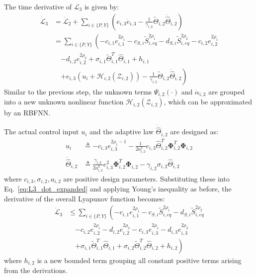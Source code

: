 The time derivative of $\mathcal{L}_3$ is given by:
\begin{align}
    \dot{\mathcal{L}}_3 &= \dot{\mathcal{L}}_2 + \sum_{i \in \{P,Y\}} \left( e_{i,3} \dot{e}_{i,3} - \frac{1}{\gamma_{i,2}} \widetilde{\Theta}_{i,2} \dot{\widehat{\Theta}}_{i,2} \right) \nonumber \\
    &= \sum_{i \in \{P,Y\}} \left( -c_{i,1} e_{i,1}^{2\rho_1} - c_{S,i} \widetilde{S}_{i,eq}^{2\rho_1} - d_{S,i} \widetilde{S}_{i,eq}^{2\rho_2} - c_{i,2} e_{i,2}^{2\rho_1} \right. \nonumber \\
    &\quad \left. - d_{i,2} e_{i,2}^{2\rho_2} + \sigma_{i,1} \widetilde{\Theta}_{i,1}^T \widehat{\Theta}_{i,1} + h_{i,1} \right. \nonumber \\
    &\quad \left. + e_{i,3} (u_i + \mathcal{H}_{i,2}(\mathcal{Z}_{i,2})) - \frac{1}{\gamma_{i,2}} \widetilde{\Theta}_{i,2} \dot{\widehat{\Theta}}_{i,2} \right) \label{eq:L3_dot_expanded}
\end{align}
Similar to the previous step, the unknown terms $\Psi_{i,2}(\cdot)$ and $\dot{\alpha}_{i,2}$ are grouped into a new unknown nonlinear function $\mathcal{H}_{i,2}(\mathcal{Z}_{i,2})$, which can be approximated by an RBFNN.

The actual control input $u_i$ and the adaptive law $\dot{\widehat{\Theta}}_{i,2}$ are designed as:
\begin{align}
    u_i &\triangleq  - c_{i,3} e_{i,3}^{2\rho_1-1} - \frac{1}{2a_{i,2}^2} e_{i,3} \widehat{\Theta}_{i,2}^T \mathbf{\Phi}_{i,2}^T \mathbf{\Phi}_{i,2} \label{eq:uk} \\
    \dot{\widehat{\Theta}}_{i,2} &\triangleq \frac{\gamma_{i,2}}{2a_{i,2}^2} e_{i,3}^2 \mathbf{\Phi}_{i,2}^T \mathbf{\Phi}_{i,2} - \gamma_{i,2} \sigma_{i,2} \widehat{\Theta}_{i,2} \label{eq:W2_hat_dot}
\end{align}
where $c_{i,3}, \sigma_{i,2}, a_{i,2}$ are positive design parameters. Substituting these into Eq.~\eqref{eq:L3_dot_expanded} and applying Young's inequality as before, the derivative of the overall Lyapunov function becomes:
\begin{align}
    \dot{\mathcal{L}}_3 &\le \sum_{i \in \{P,Y\}} \left( -c_{i,1} e_{i,1}^{2\rho_1} - c_{S,i} \widetilde{S}_{i,eq}^{2\rho_1} - d_{S,i} \widetilde{S}_{i,eq}^{2\rho_2} \right. \nonumber \\
    &\quad \left. -c_{i,2} e_{i,2}^{2\rho_1} -d_{i,2} e_{i,2}^{2\rho_2} - c_{i,3} e_{i,3}^{2\rho_1} - d_{i,3} e_{i,3}^{2\rho_2} \right. \nonumber \\
    &\quad \left. + \sigma_{i,1} \widetilde{\Theta}_{i,1}^T \widehat{\Theta}_{i,1} + \sigma_{i,2} \widetilde{\Theta}_{i,2}^T \widehat{\Theta}_{i,2} + h_{i,2} \right) \label{eq:L3_dot_final}
\end{align}
where $h_{i,2}$ is a new bounded term grouping all constant positive terms arising from the derivations.

